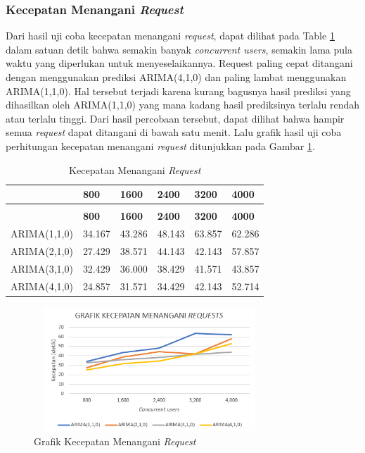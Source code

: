     	\subsubsection{Kecepatan Menangani \textit{Request}}
        	Dari hasil uji coba kecepatan menangani \textit{request}, dapat dilihat pada Table \ref{kecepatanrequest} dalam satuan detik bahwa semakin banyak \textit{concurrent users}, semakin lama pula waktu yang diperlukan untuk menyeselaikannya. Request paling cepat ditangani dengan menggunakan prediksi ARIMA(4,1,0) dan paling lambat menggunakan ARIMA(1,1,0). Hal tersebut terjadi karena kurang bagusnya hasil prediksi yang dihasilkan oleh ARIMA(1,1,0) yang mana kadang hasil prediksinya terlalu rendah atau terlalu tinggi.
            Dari hasil percobaan tersebut, dapat dilihat bahwa hampir semua \textit{request} dapat ditangani di bawah satu menit. Lalu grafik hasil uji coba perhitungan kecepatan menangani \textit{request} ditunjukkan pada Gambar \ref{grunningtime}.
            \begin{longtable}{|p{}|p{}|p{}|p{}|p{}|p{}|}
        \caption{Kecepatan Menangani \textit{Request}} \label{kecepatanrequest} \\
            \hline
            & \textbf{800} & \textbf{1600} & \textbf{2400} & \textbf{3200} & \textbf{4000} \\ \hline
            \endfirsthead
            \caption[]{Kecepatan Menangani \textit{Request}} \\
            \hline
            & \textbf{800} & \textbf{1600} & \textbf{2400} & \textbf{3200} & \textbf{4000} \\ \hline
            \endhead
            \endfoot
            \endlastfoot
			
          	ARIMA(1,1,0) & 34.167 & 43.286 & 48.143 & 63.857 & 62.286 \\ \hline
            ARIMA(2,1,0) & 27.429 & 38.571 & 44.143 & 42.143 & 57.857 \\ \hline
            ARIMA(3,1,0) & 32.429 & 36.000 & 38.429 & 41.571 & 43.857 \\ \hline
            ARIMA(4,1,0) & 24.857 & 31.571 & 34.429 & 42.143 & 52.714 \\ \hline
		\end{longtable}
         
        	\begin{figure}[H]
				\centering
				\includegraphics[width=8.7cm,height=4.7cm]{Images/C-5/runningtime.png}
				\caption{Grafik Kecepatan Menangani \textit{Request}}
				\label{grunningtime}
			\end{figure}
            
